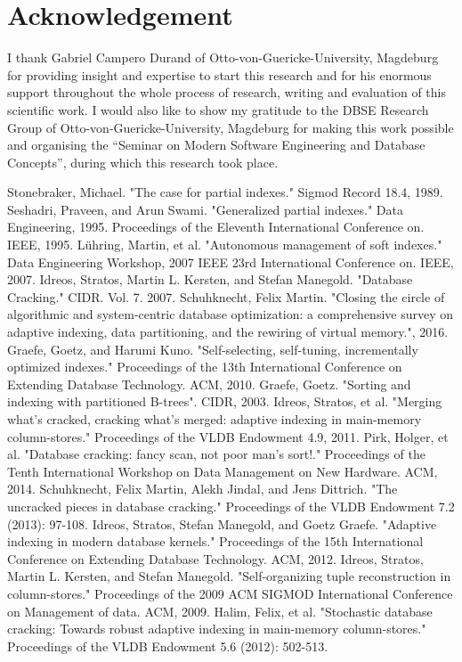 \documentclass[10pt, conference, compsocconf]{IEEEtran}
\begin{document}
\section*{Acknowledgement}
I thank Gabriel Campero Durand of Otto-von-Guericke-University, Magdeburg for providing insight and expertise to start this research and for his enormous support throughout the whole process of research, writing and evaluation of this scientific work. I would also like to show my gratitude to the DBSE Research Group of Otto-von-Guericke-University, Magdeburg for making this work possible and organising the ``Seminar on Modern Software Engineering and Database Concepts'', during which this research took place.

\begin{thebibliography}{8}

Stonebraker, Michael. "The case for partial indexes." Sigmod Record 18.4, 1989.
Seshadri, Praveen, and Arun Swami. "Generalized partial indexes." Data Engineering, 1995. Proceedings of the Eleventh International Conference on. IEEE, 1995.
L\"uhring, Martin, et al. "Autonomous management of soft indexes." Data Engineering Workshop, 2007 IEEE 23rd International Conference on. IEEE, 2007.
Idreos, Stratos, Martin L. Kersten, and Stefan Manegold. "Database Cracking." CIDR. Vol. 7. 2007.
Schuhknecht, Felix Martin. "Closing the circle of algorithmic and system-centric database optimization: a comprehensive survey on adaptive indexing, data partitioning, and the rewiring of virtual memory.", 2016.
Graefe, Goetz, and Harumi Kuno. "Self-selecting, self-tuning, incrementally optimized indexes." Proceedings of the 13th International Conference on Extending Database Technology. ACM, 2010.
Graefe, Goetz. "Sorting and indexing with partitioned B-trees". CIDR, 2003.
Idreos, Stratos, et al. "Merging what's cracked, cracking what's merged: adaptive indexing in main-memory column-stores." Proceedings of the VLDB Endowment 4.9, 2011.
Pirk, Holger, et al. "Database cracking: fancy scan, not poor man's sort!." Proceedings of the Tenth International Workshop on Data Management on New Hardware. ACM, 2014.
Schuhknecht, Felix Martin, Alekh Jindal, and Jens Dittrich. "The uncracked pieces in database cracking." Proceedings of the VLDB Endowment 7.2 (2013): 97-108.
Idreos, Stratos, Stefan Manegold, and Goetz Graefe. "Adaptive indexing in modern database kernels." Proceedings of the 15th International Conference on Extending Database Technology. ACM, 2012.
Idreos, Stratos, Martin L. Kersten, and Stefan Manegold. "Self-organizing tuple reconstruction in column-stores." Proceedings of the 2009 ACM SIGMOD International Conference on Management of data. ACM, 2009.
Halim, Felix, et al. "Stochastic database cracking: Towards robust adaptive indexing in main-memory column-stores." Proceedings of the VLDB Endowment 5.6 (2012): 502-513.

\end{thebibliography}
\end{document}
